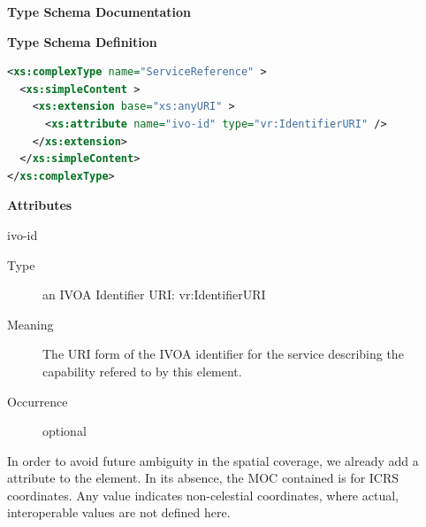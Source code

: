 \documentclass[11pt,a4paper]{ivoa}
\begin{document}
\begin{generated}
\begingroup
      	\renewcommand*\descriptionlabel[1]{%
      	\hbox to 5.5em{\emph{#1}\hfil}}\vspace{2ex}\noindent\textbf{ Type Schema Documentation}


\vspace{1ex}\noindent\textbf{ Type Schema Definition}

\begin{lstlisting}[language=XML,basicstyle=\footnotesize]
<xs:complexType name="ServiceReference" >
  <xs:simpleContent >
    <xs:extension base="xs:anyURI" >
      <xs:attribute name="ivo-id" type="vr:IdentifierURI" />
    </xs:extension>
  </xs:simpleContent>
</xs:complexType>
\end{lstlisting}

\vspace{0.5ex}\noindent\textbf{ Attributes}

\begingroup\small\begin{bigdescription}
\item[ivo-id]
\begin{description}
\item[Type] an IVOA Identifier URI: vr:IdentifierURI
\item[Meaning] 
                   The URI form of the IVOA identifier for the service 
                   describing the capability refered to by this element.
                 
\item[Occurrence] optional
\end{description}


\end{bigdescription}\endgroup

\endgroup
\end{generated}


In order to avoid future ambiguity in the spatial coverage, we already
add a  attribute to the  element.  In its
absence, the MOC contained is for ICRS coordinates.  Any value indicates
non-celestial coordinates, where actual, interoperable values are not
defined here.
\end{document}
